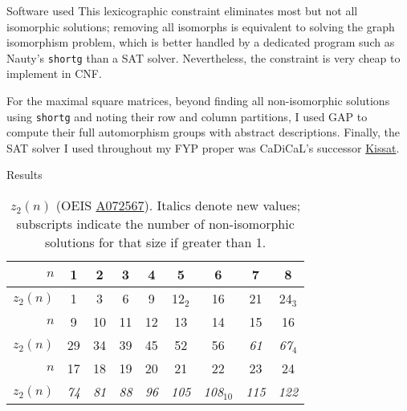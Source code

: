 \documentclass[10pt]{beamer}
\begin{document}
\begin{frame}{Software used}
This lexicographic constraint eliminates most but not all isomorphic solutions; removing all isomorphs is equivalent to solving the graph isomorphism problem, which is better handled by a dedicated program such as Nauty's \texttt{shortg} \cite{nauty} than a SAT solver. Nevertheless, the constraint is very cheap to implement in CNF.

For the maximal square matrices, beyond finding all non-isomorphic solutions using \texttt{shortg} and noting their row and column partitions, I used GAP to compute their full automorphism groups with abstract descriptions. Finally, the SAT solver I used throughout my FYP proper was CaDiCaL's successor \href{https://github.com/arminbiere/kissat}{Kissat}.
\end{frame}

\begin{frame}{Results}
  \begin{table}
    \caption{$z_2(n)$ (OEIS \href{https://oeis.org/A072567}{A072567}). Italics denote new values; subscripts indicate the number of non-isomorphic solutions for that size if greater than 1.}
    \begin{tabular}{rcccccccc}
      \toprule
      $n$&1&2&3&4&5&6&7&8\\
      \midrule
      $z_2(n)$&1&3&6&9&12$_2$&16&21&24$_3$\\
      \bottomrule
      \toprule
      $n$&9&10&11&12&13&14&15&16\\
      \midrule
      $z_2(n)$&29&34&39&45&52&56&\textit{61}&\textit{67}$_4$\\
      \bottomrule
      \toprule
      $n$&17&18&19&20&21&22&23&24\\
      \midrule
      $z_2(n)$&\textit{74}&\textit{81}&\textit{88}&\textit{96}&\textit{105}&\textit{108}$_{10}$&\textit{115}&\textit{122}\\
      \bottomrule
    \end{tabular}
  \end{table}
\end{frame}
\end{document}

